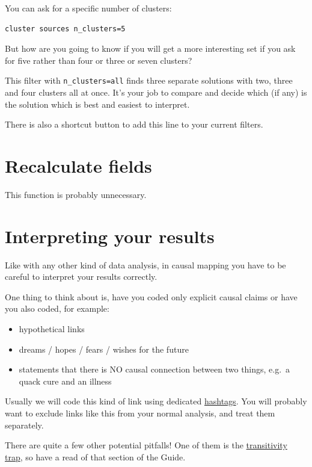 \documentclass[
]{book}
\providecommand{\tightlist}{%
  \setlength{\itemsep}{0pt}\setlength{\parskip}{0pt}}
\begin{document}
You can ask for a specific number of clusters:

\begin{verbatim}
cluster sources n_clusters=5
\end{verbatim}

But how are you going to know if you will get a more interesting set if you ask for five rather than four or three or seven clusters?

This filter with \texttt{n\_clusters=all} finds three separate solutions with two, three and four clusters all at once. It's your job to compare and decide which (if any) is the solution which is best and easiest to interpret.

There is also a shortcut button to add this line to your current filters.

\hypertarget{recalculate}{%
\chapter{Recalculate fields}\label{recalculate}}

This function is probably unnecessary.

\hypertarget{xinterpret}{%
\chapter{Interpreting your results}\label{xinterpret}}

Like with any other kind of data analysis, in causal mapping you have to be careful to interpret your results correctly.

One thing to think about is, have you coded only explicit causal claims or have you also coded, for example:

\begin{itemize}
\tightlist
\item
  hypothetical links
\item
  dreams / hopes / fears / wishes for the future
\item
  statements that there is NO causal connection between two things, e.g.~a quack cure and an illness
\end{itemize}

Usually we will code this kind of link using dedicated \href{https://guide.causalmap.app/xcoding-panel.html\#xhashtags}{hashtags}. You will probably want to exclude links like this from your normal analysis, and treat them separately.

There are quite a few other potential pitfalls! One of them is the \href{https://guide.causalmap.app/xtransitivity-trap.html}{transitivity trap}, so have a read of that section of the Guide.
\end{document}
